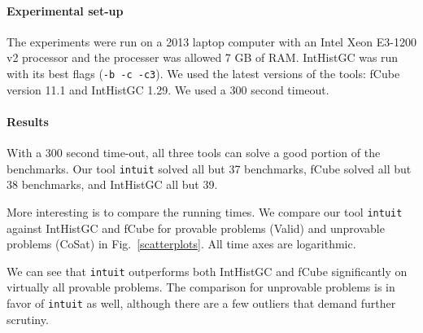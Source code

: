 \documentclass{llncs}
\begin{document}

\paragraph{Experimental set-up} The experiments were run on a 2013 laptop computer
with an Intel Xeon E3-1200 v2 processor and the processer was allowed 7 GB of RAM.
IntHistGC was run with its best flags ({\tt -b -c -c3}). We used the latest versions of the tools: fCube version 11.1 and IntHistGC 1.29. We used a 300 second timeout.

\paragraph{Results} With a 300 second time-out, all three tools can solve a good portion of the benchmarks. Our tool {\tt intuit} solved all but 37 benchmarks, fCube solved all but 38 benchmarks, and IntHistGC all but 39.






More interesting is to compare the running times. We compare our tool {\tt intuit} against IntHistGC and fCube for provable problems (Valid) and unprovable problems (CoSat) in Fig.\ \ref{scatterplots}. All time axes are logarithmic. 

We can see that {\tt intuit} outperforms both IntHistGC and fCube significantly on virtually all provable problems. The comparison for unprovable problems is in favor of {\tt intuit} as well, although there are a few outliers that demand further scrutiny.
\end{document}
